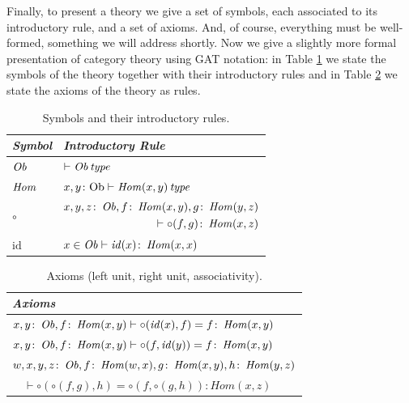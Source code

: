 Finally, to present a theory we give a set of symbols,
each associated to its introductory rule, and a set of axioms.
And, of course, everything must be well-formed, something we will address shortly.
Now we give a slightly more formal presentation of category theory using GAT notation: 
in Table \ref{table:categories-symbols} we state the symbols of the theory together with their introductory rules
and in Table \ref{table:categories-axioms} we state the axioms of the theory as rules.

\begin{table}[htbp]
  \centering
  \renewcommand{\arraystretch}{1.4}
  \begin{tabular}{@{} l p{10cm} @{}}
    \toprule
    \textit{Symbol} & \textit{Introductory Rule} \\
    \midrule
    $\operatorname{\mathit{Ob}}$   & $\vdash \operatorname{\mathit{Ob}} \operatorname{\mathit{\space type}}$ \\
    $\operatorname{\mathit{Hom}}$  & $x, y \colon \mathrm{Ob} \vdash \operatorname{\mathit{Hom}}(x, y) \operatorname{\mathit{\space type}}$ \\
    $\circ$ & $\begin{aligned}[t]
                x, y, z \colon \operatorname{\mathit{Ob}}, f \colon \operatorname{\mathit{Hom}}(x,y), g \colon \operatorname{\mathit{Hom}}(y,z) \\
                \vdash \circ(f,g) \colon \operatorname{\mathit{Hom}}(x,z)
              \end{aligned}$ \\
    $\mathrm{id}$   & $x \in \operatorname{\mathit{Ob}} \vdash \operatorname{\mathit{id}}(x) \colon \operatorname{\mathit{Hom}}(x,x)$ \\
    \bottomrule
  \end{tabular}
  \caption{Symbols and their introductory rules.}
  \label{table:categories-symbols}
\end{table}

\begin{table}[htbp]
  \centering
  \renewcommand{\arraystretch}{1.6}
  \begin{tabular}{@{} l @{}}
    \toprule
    \textit{Axioms} \\
    \midrule
    $x, y \colon \operatorname{\mathit{Ob}}, f \colon \operatorname{\mathit{Hom}}(x, y) \vdash \circ(\operatorname{\mathit{id}}(x), f) = f \colon \operatorname{\mathit{Hom}}(x, y)$ \\
    $x, y \colon \operatorname{\mathit{Ob}}, f \colon \operatorname{\mathit{Hom}}(x, y) \vdash \circ(f, \operatorname{\mathit{id}}(y)) = f \colon \operatorname{\mathit{Hom}}(x, y)$ \\
    $w, x, y, z \colon \operatorname{\mathit{Ob}}, f \colon \operatorname{\mathit{Hom}}(w, x), g \colon \operatorname{\mathit{Hom}}(x, y), h \colon \operatorname{\mathit{Hom}}(y, z)$ \\
    $\quad \vdash \circ(\circ(f, g), h) = \circ(f, \circ(g, h)) \colon Hom(x, z)$ \\
    \bottomrule
  \end{tabular}
  \caption{Axioms (left unit, right unit, associativity).}
  \label{table:categories-axioms}
\end{table}


